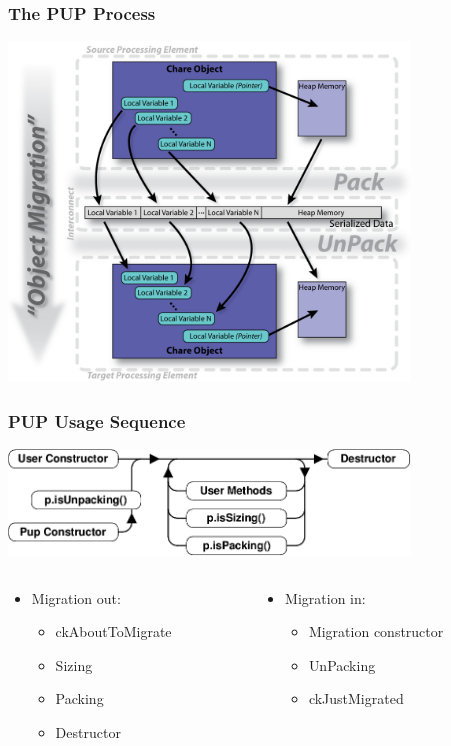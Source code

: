 \begin{frame}[fragile]
\frametitle{The PUP Process}
  \begin{center}
    \includegraphics[width=0.8\textwidth]{figures/PUPProcess.png}
  \end{center}
\end{frame}


\begin{frame}[fragile]
\frametitle{PUP Usage Sequence}
  \begin{center}
    \includegraphics[width=0.8\textwidth]{figures/PUPUsage.png}
  \end{center}
\begin{columns}
 \begin{column}{0.5\textwidth}
 \begin{itemize}
 \item Migration out:
 \begin{itemize}
 \item ckAboutToMigrate
 \item Sizing
 \item Packing
 \item Destructor
 \end{itemize}
 \end{itemize}
 \end{column}
 \begin{column}{0.5\textwidth}
 \begin{itemize}
 \item Migration in:
 \begin{itemize}
 \item Migration constructor
 \item UnPacking
 \item ckJustMigrated
 \end{itemize}
 \end{itemize}
\end{column}
\end{columns}
\end{frame}

